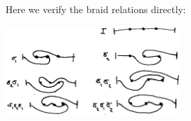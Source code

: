 \documentclass[12pt,a4paper]{article}
\begin{document}


Here we verify the braid relations directly:

\begin{center}
\includegraphics[width=0.5\textwidth]{curve-braid.eps}
\end{center}

\cite{Dehornoy02}













{}

\end{document}
